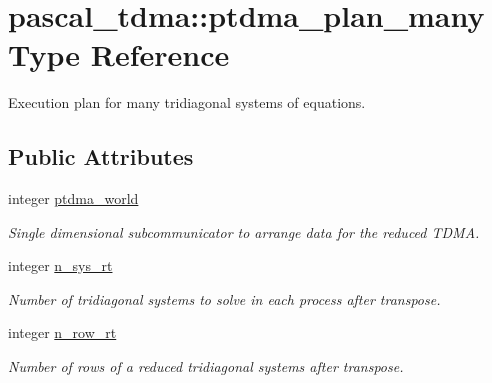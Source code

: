 \hypertarget{structpascal__tdma_1_1ptdma__plan__many}{}\section{pascal\+\_\+tdma\+::ptdma\+\_\+plan\+\_\+many Type Reference}
\label{structpascal__tdma_1_1ptdma__plan__many}


Execution plan for many tridiagonal systems of equations.  


\subsection*{Public Attributes}
\begin{DoxyCompactItemize}
\item 
integer \mbox{\hyperlink{structpascal__tdma_1_1ptdma__plan__many_acb7e645e37c791564905c6e2808db0c6}{ptdma\+\_\+world}}
\begin{DoxyCompactList}\small\item\em Single dimensional subcommunicator to arrange data for the reduced T\+D\+MA. \end{DoxyCompactList}\item 
integer \mbox{\hyperlink{structpascal__tdma_1_1ptdma__plan__many_a22b42947ab742f83aad3bbeb3a42a0f6}{n\+\_\+sys\+\_\+rt}}
\begin{DoxyCompactList}\small\item\em Number of tridiagonal systems to solve in each process after transpose. \end{DoxyCompactList}\item 
integer \mbox{\hyperlink{structpascal__tdma_1_1ptdma__plan__many_ad94248e2aa0653f151f0575d62d6fff7}{n\+\_\+row\+\_\+rt}}
\begin{DoxyCompactList}\small\item\em Number of rows of a reduced tridiagonal systems after transpose. \end{DoxyCompactList}\end{DoxyCompactItemize}
\textbf{ }\par
